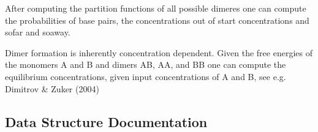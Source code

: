 After computing the partition functions of all possible dimeres one can compute the probabilities of base pairs, the concentrations out of start concentrations and sofar and soaway.

Dimer formation is inherently concentration dependent. Given the free energies of the monomers A and B and dimers AB, AA, and BB one can compute the equilibrium concentrations, given input concentrations of A and B, see e.\+g. Dimitrov \& Zuker (2004) 

\subsection{Data Structure Documentation}
\label{structvrna__dimer__pf__s}
\hypertarget{group__pf__cofold_structvrna__dimer__pf__s}{}
